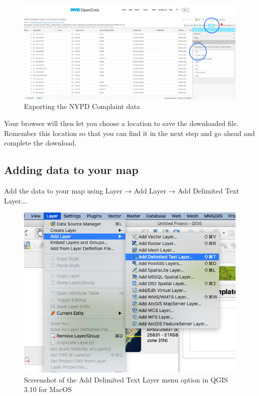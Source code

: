 \documentclass[]{book}
\begin{document}
\begin{figure}
\centering
\includegraphics{images/NYPD_CD_visualize_export.png}
\caption{Exporting the NYPD Complaint data}
\end{figure}

Your browser will then let you choose a location to save the downloaded file. Remember this location so that you can find it in the next step and go ahead and complete the download.

\hypertarget{adding-data-to-your-map}{%
\subsection{Adding data to your map}\label{adding-data-to-your-map}}

Add the data to your map using Layer → Add Layer → Add Delimited Text Layer\ldots{}.

\begin{figure}
\centering
\includegraphics{images/add_deilmited_text_layer.png}
\caption{Screenshot of the Add Delimited Text Layer menu option in QGIS 3.10 for MacOS}
\end{figure}
\end{document}
